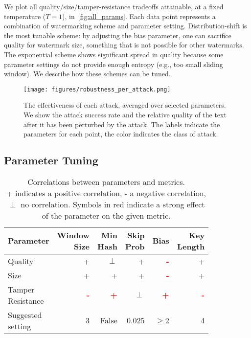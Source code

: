 \smallskip{}
%
We plot all quality/size/tamper-resistance tradeoffs attainable, at a fixed temperature ($T=1$), in~\cref{fig:all_params}.
Each data point represents a combination of watermarking scheme and parameter setting.
Distribution-shift is the most tunable scheme: by adjusting the bias parameter, one can sacrifice quality 
for watermark size, something that is not possible for other watermarks.
The exponential scheme shows significant spread in quality because some parameter settings do not 
provide enough entropy (e.g., too small sliding window).
We describe how these schemes can be tuned.

\begin{figure*}[th]
\texttt{[image: figures/robustness\_per\_attack.png]}
\centering
\caption{The effectiveness of each attack, averaged over selected parameters. We show the attack success rate and the relative quality of the text after it has been perturbed by the attack. The labels indicate the parameters for each point, the color indicates the class of attack.}
\label{robustness-all-attacks}
\end{figure*}

\subsection{Parameter Tuning}
\label{ssec:param_tuning}

\begin{table}[b!]
\centering
\caption{Correlations between parameters and metrics.\\
+ indicates a positive correlation, - a negative correlation, $\perp$ no correlation. 
Symbols in red indicate a strong effect of the parameter on the given metric.}
\label{parameter-effects}
\small
\begin{tabular}{|l||r|r|r|r|r|} 
\hline
Parameter & \makecell{Window\\Size} & \makecell{Min\\Hash} & \makecell{Skip\\Prob} & Bias & \makecell{Key\\Length} \\
\hline
\hline
Quality & + & $\perp$ & + & \textcolor{red}{\bf{-}} & + \\
\hline
Size & + & + & + & \textcolor{red}{\bf{-}} & +\\
\hline
\makecell{Tamper\\Resistance} & \textcolor{red}{\bf{-}} & \textcolor{red}{\bf{+}} & $\perp$ & \textcolor{red}{\bf{+}} & \textcolor{red}{\bf{-}}\\
\hline
\hline
\makecell{Suggested\\setting} & 3 & False & 0.025 & $\geq$2 & 4\\
\hline
\end{tabular}
\end{table}


